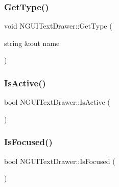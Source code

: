 \hypertarget{class_n_g_u_i_text_drawer_a9c582a2297409366529791457ba464d3}{}\label{class_n_g_u_i_text_drawer_a9c582a2297409366529791457ba464d3} 
\subsubsection{\texorpdfstring{Get\+Type()}{GetType()}}
{\footnotesize\ttfamily void N\+G\+U\+I\+Text\+Drawer\+::\+Get\+Type (\begin{DoxyParamCaption}\item[{string \&out}]{name }\end{DoxyParamCaption})}

\hypertarget{class_n_g_u_i_text_drawer_a42247131d939c6430d4563f164eb4632}{}\label{class_n_g_u_i_text_drawer_a42247131d939c6430d4563f164eb4632} 
\subsubsection{\texorpdfstring{Is\+Active()}{IsActive()}}
{\footnotesize\ttfamily bool N\+G\+U\+I\+Text\+Drawer\+::\+Is\+Active (\begin{DoxyParamCaption}{ }\end{DoxyParamCaption})}

\hypertarget{class_n_g_u_i_text_drawer_aef877469baba629f962b257be05d62c1}{}\label{class_n_g_u_i_text_drawer_aef877469baba629f962b257be05d62c1} 
\subsubsection{\texorpdfstring{Is\+Focused()}{IsFocused()}}
{\footnotesize\ttfamily bool N\+G\+U\+I\+Text\+Drawer\+::\+Is\+Focused (\begin{DoxyParamCaption}{ }\end{DoxyParamCaption})}

\hypertarget{class_n_g_u_i_text_drawer_a3c91971b50a71a36e461fed2d7e5ce37}{}\label{class_n_g_u_i_text_drawer_a3c91971b50a71a36e461fed2d7e5ce37} 
